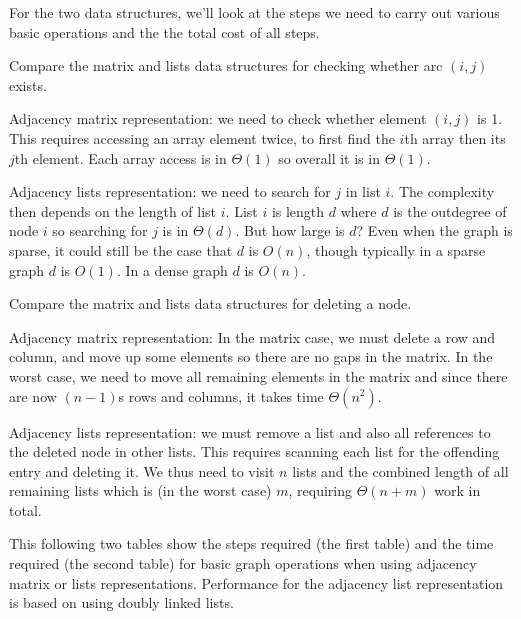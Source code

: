 For the two data structures, we'll look at the steps we need to carry out various basic operations and the the total cost of all steps. 

\begin{Boxample}[0]
Compare the matrix and lists data structures for checking whether arc $(i,j)$ exists.
 
Adjacency matrix representation: we need to check whether element $(i,j)$ is 1. This requires accessing
an array element twice, to first find the $i$th array then its $j$th element. Each array access is in $\Theta(1)$ so overall it is in $\Theta(1)$.

Adjacency lists representation: we need to search for $j$ in list $i$. The complexity then depends on the length of list $i$. 
List $i$ is length $d$ where $d$ is the outdegree of node $i$ so searching for $j$ is in $\Theta(d)$. 
But how large is $d$? Even when the graph is sparse, it could still be the case that $d$ is $O(n)$, though typically in a sparse graph $d$ is $O(1)$.  
In a dense graph $d$ is $O(n)$.
\end{Boxample}

\begin{Boxample}[0]
Compare the matrix and lists data structures for deleting a node.

Adjacency matrix representation: In the matrix case, we must delete a row and column, 
and move up some elements so there are no gaps in the matrix. 
In the worst case, we need to move all remaining elements in the matrix and since there are now $(n-1)$s rows and columns, it takes time $\Theta(n^2)$.

Adjacency lists representation: we must remove a list and also all references to the deleted node in other lists. 
This requires scanning each list for the offending entry and deleting it. 
We thus need to visit $n$ lists and the combined length of all remaining lists which is (in the worst case) $m$, requiring $\Theta(n+m)$ work in total.
\end{Boxample}

This following two tables  show the steps required (the first table) 
and the time required (the second table) for basic graph operations when using adjacency matrix or lists representations.  
Performance for the adjacency list representation is based on using doubly linked lists.

